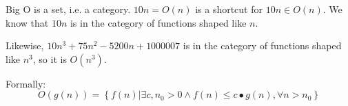 \documentclass{article}
\begin{document}
Big O is a set, i.e. a category.
$10n = O(n)$ is a shortcut for $10n \in O(n)$.  We know that $10n$ is in the category of functions shaped
like $n$.  

Likewise, $10n^3 + 75n^2 - 5200n + 1000007$ is in the category of functions shaped like $n^3$, so it is $O(n^3)$.

Formally:
$$ O(g(n)) = \left\{ {f(n) | \exists c,n_0 > 0 \land f(n) \leq c\bullet g(n), \forall n>n_0 }\right\}$$
\end{document}
